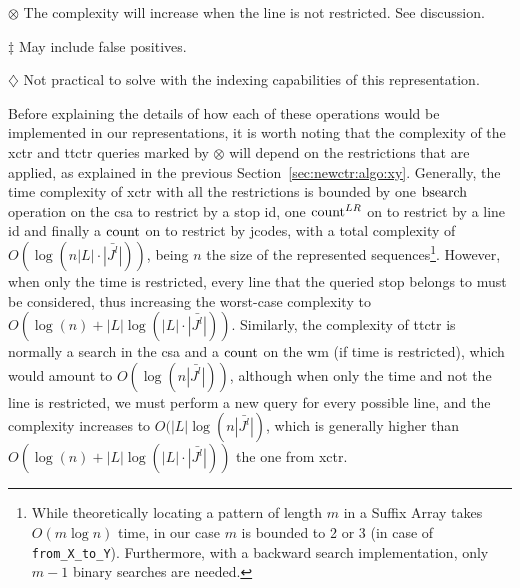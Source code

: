 \begin{threeparttable}
    \begin{tablenotes}
    \item[$\otimes$] The complexity will increase when the line is not restricted. See discussion.
    \item[$\ddagger$] May include false positives.
    \item[$\diamondsuit$] Not practical to solve with the indexing capabilities of this representation.
    \end{tablenotes}
    \end{threeparttable}
    
    \medskip
    Before explaining the details of how each of these operations would be implemented in our representations, it is worth noting that the complexity of the \gls{xctr} and \gls{ttctr} queries marked by $\otimes$ will depend on the restrictions that are applied, as explained in the previous Section~\ref{sec:newctr:algo:xy}. Generally, the time complexity of \gls{xctr} with all the restrictions is bounded by one $\operatorname{bsearch}$ operation on the \gls{csa} to restrict by a stop id, one $\operatorname{count}^{LR}$ on  to restrict by a line id and finally a $\operatorname{count}$ on  to restrict by jcodes, with a total complexity of $O(\log(n |L|\cdot \bar{|J^l|}))$, being $n$ the size of the represented sequences\footnote{While theoretically locating a pattern of length $m$ in a Suffix Array takes $O(m \log n)$ time, in our case $m$ is bounded to 2 or 3 (in case of \texttt{from\_X\_to\_Y}). Furthermore, with a backward search implementation, only $m-1$ binary searches are needed.}.
    However, when only the time is restricted, every line that the queried stop belongs to must be considered, thus increasing the worst-case complexity to $O(\log(n) + |L|\log(|L|\cdot \bar{|J^l|}))$. Similarly, the complexity of \gls{ttctr} is normally a search in the \gls{csa} and a $\operatorname{count}$ on the \gls{wm} (if time is restricted), which would amount to $O(\log(n\bar{|J^l|}))$, although when only the time and not the line is restricted, we must perform a new query for every possible line, and the complexity increases to $O(|L|\log(n\bar{|J^l|})$, which is generally higher than $O(\log(n) + |L|\log(|L|\cdot \bar{|J^l|}))$ the one from \gls{xctr}.
    
